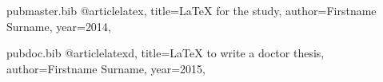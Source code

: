 \begin{filecontents*}{pubmaster.bib}
	@article{latex,
		title={{\LaTeX} for the study},
		author={Firstname Surname},
		year={2014},
	}
\end{filecontents*}

\begin{filecontents*}{pubdoc.bib}
	@article{latexd,
		title={{\LaTeX} to write a doctor thesis},
		author={Firstname Surname},
		year={2015},
	}
\end{filecontents*}


\documentclass[9pt,a4paper]{moderncv}


\usepackage[utf8]{inputenc}

\usepackage{amsmath}
\usepackage[scale=0.85]{geometry}
\recomputelengths                             %

\renewcommand*{\bibliographyitemlabel}{[\arabic{enumiv}]}
\usepackage{multibib}




	\maketitle
	
	\section{Career Objective}
	
	\section{Skill Sets}
	 {C, C++, R, HTML Core Java and AspectJ}{}{} {}{}
	 {Windows and Linux}{}{} {}{}
	 {Microsoft Office}{}{} {}{}
	 {Java Script and VB Script}{}{} {}{}
	
